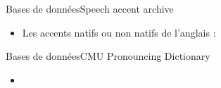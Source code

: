 \documentclass[xcolor=dvipsnames, onlymath, 10pt, aspectratio=169, handout]{beamer}
\begin{document}


\begin{frame}{Bases de données}{Speech accent archive}

	\begin{itemize}
		\item[] Les accents natifs ou non natifs de l'anglais : 
	\end{itemize}

	\begin{center}
	\end{center}


\end{frame}


\begin{frame}{Bases de données}{CMU Pronouncing Dictionary}

	\begin{itemize}
		\item {}
	\end{itemize}

	\begin{center}
	\end{center}


\end{frame}


\end{document}
